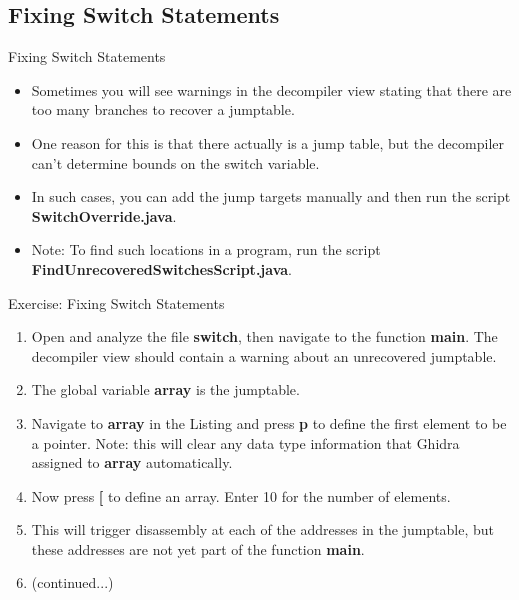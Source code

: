 \documentclass{beamer}
\begin{document}
\subsection{Fixing Switch Statements}
\begin{frame}
\begin{block}{Fixing Switch Statements}
\begin{itemize}
\item Sometimes you will see warnings in the decompiler view stating that there are too many branches to recover a jumptable. 
\item One reason for this is that there actually is a jump table, but the decompiler can't determine bounds on the switch variable.
\item In such cases, you can add the jump targets manually and then run the script \textbf{SwitchOverride.java}. 
\item Note: To find such locations in a program, run the script \textbf{FindUnrecoveredSwitchesScript.java}.
\end{itemize}
\end{block}
\end{frame}

\begin{frame}
\begin{block}{Exercise: Fixing Switch Statements}
\begin{enumerate}
\item Open and analyze the file \textbf{switch}, then navigate to the function \textbf{main}. The decompiler view should contain a warning about an unrecovered jumptable.
\item The global variable \textbf{array} is the jumptable. 
\item Navigate to \textbf{array} in the Listing and press \textbf{p} to define the first element to be a pointer.  Note: this will clear any data type information that Ghidra assigned to 
\textbf{array} automatically.
\item Now press \textbf{[} to define an array.  Enter 10 for the number of elements. 
\item This will trigger disassembly at each of the addresses in the jumptable, but these addresses are not yet part of the function \textbf{main}.
\item[] (continued...)
\end{enumerate}
\end{block}
\end{frame}
\end{document}
